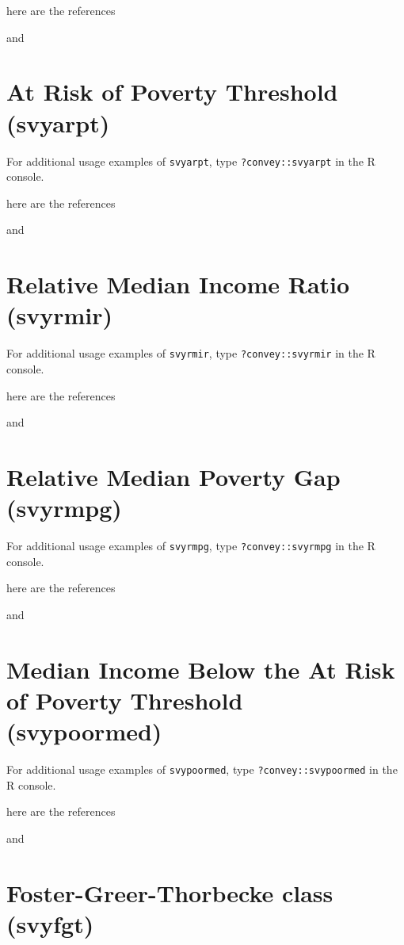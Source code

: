 \documentclass[]{book}
\begin{document}
here are the references

\citep{osier2009} and \citep{deville1999}

\section{At Risk of Poverty Threshold
(svyarpt)}\label{at-risk-of-poverty-threshold-svyarpt}

For additional usage examples of \texttt{svyarpt}, type
\texttt{?convey::svyarpt} in the R console.

here are the references

\citep{osier2009} and \citep{deville1999}

\section{Relative Median Income Ratio
(svyrmir)}\label{relative-median-income-ratio-svyrmir}

For additional usage examples of \texttt{svyrmir}, type
\texttt{?convey::svyrmir} in the R console.

here are the references

\citep{osier2009} and \citep{deville1999}

\section{Relative Median Poverty Gap
(svyrmpg)}\label{relative-median-poverty-gap-svyrmpg}

For additional usage examples of \texttt{svyrmpg}, type
\texttt{?convey::svyrmpg} in the R console.

here are the references

\citep{osier2009} and \citep{deville1999}

\section{Median Income Below the At Risk of Poverty Threshold
(svypoormed)}\label{median-income-below-the-at-risk-of-poverty-threshold-svypoormed}

For additional usage examples of \texttt{svypoormed}, type
\texttt{?convey::svypoormed} in the R console.

here are the references

\citep{osier2009} and \citep{deville1999}

\section{Foster-Greer-Thorbecke class
(svyfgt)}\label{foster-greer-thorbecke-class-svyfgt}
\end{document}
